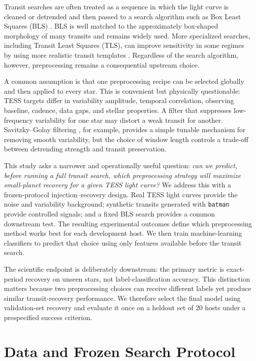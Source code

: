 \documentclass[10pt,twocolumn]{article}
\begin{document}
Transit searches are often treated as a sequence in which the light curve is cleaned or detrended and then passed to a search algorithm such as Box Least Squares (BLS) \cite{kovacs2002}. BLS is well matched to the approximately box-shaped morphology of many transits and remains widely used. More specialized searches, including Transit Least Squares (TLS), can improve sensitivity in some regimes by using more realistic transit templates \cite{hippke2019}. Regardless of the search algorithm, however, preprocessing remains a consequential upstream choice.

A common assumption is that one preprocessing recipe can be selected globally and then applied to every star. This is convenient but physically questionable: TESS targets differ in variability amplitude, temporal correlation, observing baseline, cadence, data gaps, and stellar properties. A filter that suppresses low-frequency variability for one star may distort a weak transit for another. Savitzky--Golay filtering \cite{savitzky1964}, for example, provides a simple tunable mechanism for removing smooth variability, but the choice of window length controls a trade-off between detrending strength and transit preservation.

This study asks a narrower and operationally useful question: \emph{can we predict, before running a full transit search, which preprocessing strategy will maximize small-planet recovery for a given TESS light curve?} We address this with a frozen-protocol injection--recovery design. Real TESS light curves provide the noise and variability background; synthetic transits generated with \texttt{batman} \cite{kreidberg2015} provide controlled signals; and a fixed BLS search provides a common downstream test. The resulting experimental outcomes define which preprocessing method works best for each development host. We then train machine-learning classifiers to predict that choice using only features available before the transit search.

The scientific endpoint is deliberately downstream: the primary metric is exact-period recovery on unseen stars, not label-classification accuracy. This distinction matters because two preprocessing choices can receive different labels yet produce similar transit-recovery performance. We therefore select the final model using validation-set recovery and evaluate it once on a heldout set of 20 hosts under a prespecified success criterion.

\section{Data and Frozen Search Protocol}
\end{document}
